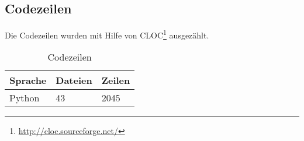 \subsection{Codezeilen}
Die Codezeilen wurden mit Hilfe von CLOC\footnote{\url{http://cloc.sourceforge.net/}} ausgezählt. \\

\begin{table}[H]
\centering
    \begin{tabular}{|p{3cm} |p{3cm} |p{3cm} |}
    \hline    
    \rowcolor{lightblue}
	Sprache & Dateien & Zeilen  \\ \hline   
	Python & 43 & 2045 \\ \hline
    \end{tabular}
    \caption[Codezeilen]{Codezeilen}
\end{table}

